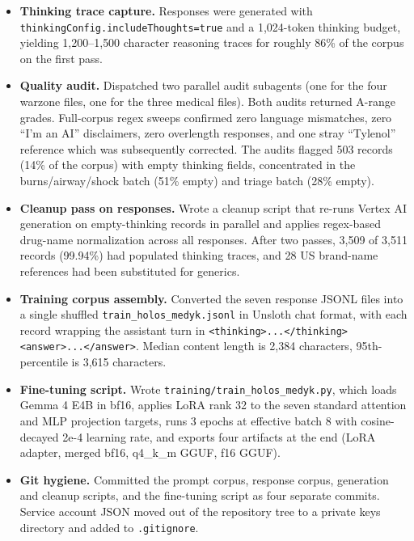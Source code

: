 \documentclass{article}
\theoremstyle{plain}
\theoremstyle{definition}
\theoremstyle{remark}
\begin{document}
\begin{itemize}
\item \textbf{Thinking trace capture.} Responses were generated with \texttt{thinkingConfig.includeThoughts=true} and a 1{,}024-token thinking budget, yielding 1{,}200--1{,}500 character reasoning traces for roughly 86\% of the corpus on the first pass.
\item \textbf{Quality audit.} Dispatched two parallel audit subagents (one for the four warzone files, one for the three medical files). Both audits returned A-range grades. Full-corpus regex sweeps confirmed zero language mismatches, zero ``I'm an AI'' disclaimers, zero overlength responses, and one stray ``Tylenol'' reference which was subsequently corrected. The audits flagged 503 records (14\% of the corpus) with empty thinking fields, concentrated in the burns/airway/shock batch (51\% empty) and triage batch (28\% empty).
\item \textbf{Cleanup pass on responses.} Wrote a cleanup script that re-runs Vertex AI generation on empty-thinking records in parallel and applies regex-based drug-name normalization across all responses. After two passes, 3{,}509 of 3{,}511 records (99.94\%) had populated thinking traces, and 28 US brand-name references had been substituted for generics.
\item \textbf{Training corpus assembly.} Converted the seven response JSONL files into a single shuffled \texttt{train\_holos\_medyk.jsonl} in Unsloth chat format, with each record wrapping the assistant turn in \texttt{<thinking>...</thinking><answer>...</answer>}. Median content length is 2{,}384 characters, 95th-percentile is 3{,}615 characters.
\item \textbf{Fine-tuning script.} Wrote \texttt{training/train\_holos\_medyk.py}, which loads Gemma 4 E4B in bf16, applies LoRA rank 32 to the seven standard attention and MLP projection targets, runs 3 epochs at effective batch 8 with cosine-decayed 2e-4 learning rate, and exports four artifacts at the end (LoRA adapter, merged bf16, q4\_k\_m GGUF, f16 GGUF).
\item \textbf{Git hygiene.} Committed the prompt corpus, response corpus, generation and cleanup scripts, and the fine-tuning script as four separate commits. Service account JSON moved out of the repository tree to a private keys directory and added to \texttt{.gitignore}.
\end{itemize}
\end{document}
